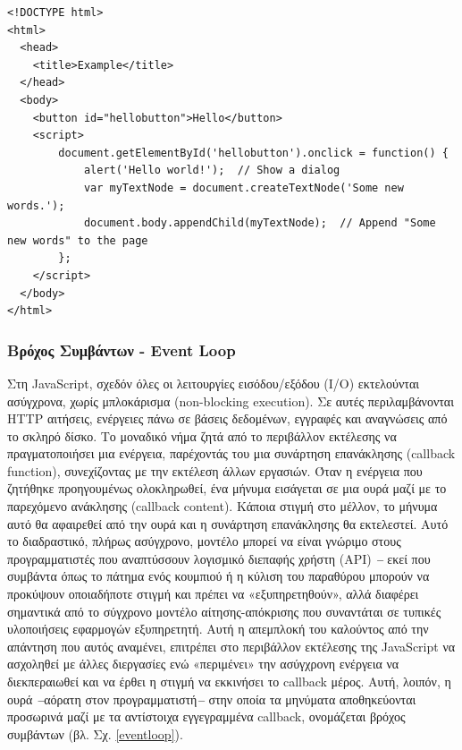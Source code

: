 \begin{lstlisting}[language=HTML5, caption=\selectlanguage{greek}Μικρό παράδειγμα μιας ιστοσελίδας που συμμορφώνεται με τα πρότυπα και περιέχει \selectlanguage{english}JavaScript\selectlanguage{greek} (χρησιμοποιώντας τη σύνταξη \selectlanguage{english}HTML5\selectlanguage{greek}) και το \selectlanguage{english}DOM\selectlanguage{greek}]
<!DOCTYPE html>
<html>
  <head>
    <title>Example</title>
  </head>
  <body>
    <button id="hellobutton">Hello</button>
    <script>
        document.getElementById('hellobutton').onclick = function() {
            alert('Hello world!');  // Show a dialog
            var myTextNode = document.createTextNode('Some new words.');
            document.body.appendChild(myTextNode);  // Append "Some new words" to the page
        };
    </script>
  </body>
</html>
\end{lstlisting}

\subsubsection{Βρόχος Συμβάντων - Event Loop}

Στη JavaScript, σχεδόν όλες οι λειτουργίες εισόδου/εξόδου (I/O) εκτελούνται ασύγχρονα, χωρίς μπλοκάρισμα (non-blocking execution). Σε αυτές περιλαμβάνονται HTTP αιτήσεις, ενέργειες πάνω σε βάσεις δεδομένων, εγγραφές και αναγνώσεις από το σκληρό δίσκο. Το μοναδικό νήμα ζητά από το περιβάλλον εκτέλεσης να πραγματοποιήσει μια ενέργεια, παρέχοντάς του μια συνάρτηση επανάκλησης (callback function), συνεχίζοντας με την εκτέλεση άλλων εργασιών. Όταν η ενέργεια που ζητήθηκε προηγουμένως ολοκληρωθεί, ένα μήνυμα εισάγεται σε μια ουρά μαζί με το παρεχόμενο ανάκλησης (callback content). Κάποια στιγμή στο μέλλον, το μήνυμα αυτό θα αφαιρεθεί από την ουρά και η συνάρτηση επανάκλησης θα εκτελεστεί. Αυτό το διαδραστικό, πλήρως ασύγχρονο, μοντέλο μπορεί να είναι γνώριμο στους προγραμματιστές που
αναπτύσσουν λογισμικό διεπαφής χρήστη (ΑΡΙ) \textit{\textbf{--}} εκεί που συμβάντα όπως το πάτημα ενός κουμπιού ή η κύλιση του παραθύρου μπορούν να προκύψουν οποιαδήποτε στιγμή και πρέπει να «εξυπηρετηθούν», αλλά διαφέρει σημαντικά από το σύγχρονο μοντέλο αίτησης-απόκρισης που συναντάται σε τυπικές υλοποιήσεις εφαρμογών εξυπηρετητή. Αυτή η απεμπλοκή του καλούντος από την απάντηση που αυτός αναμένει, επιτρέπει στο περιβάλλον εκτέλεσης της JavaScript να ασχοληθεί με άλλες διεργασίες ενώ «περιμένει» την ασύγχρονη ενέργεια να διεκπεραιωθεί και να έρθει η στιγμή να εκκινήσει το callback μέρος. Αυτή, λοιπόν, η ουρά \textit{\textbf{--}}αόρατη στον προγραμματιστή\textit{\textbf{--}} στην οποία τα μηνύματα αποθηκεύονται προσωρινά μαζί με τα αντίστοιχα εγγεγραμμένα callback, ονομάζεται βρόχος συμβάντων (βλ. Σχ. \ref{eventloop}).

